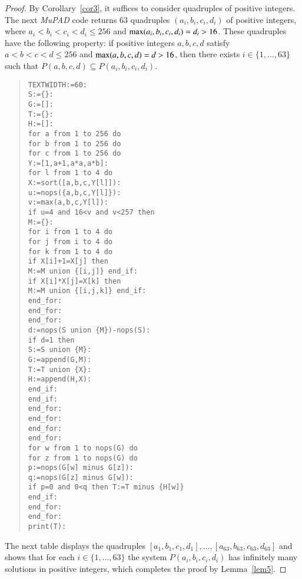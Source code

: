\documentclass[conference]{IEEEtran}
\begin{document}
\begin{proof}
By Corollary~\ref{cor3}, it suffices to consider quadruples of positive integers.
The next {\sl MuPAD} code returns $63$ quadruples \mbox{$(a_i,b_i,c_i,d_i)$} of positive integers,
where \mbox{$a_i<b_i<c_i<d_i \leqslant 256$} and \mbox{${\rm max}(a_i,b_i,c_i,d_i)=d_i>16$}. These quadruples
have the following property: if positive integers \mbox{$a,b,c,d$} satisfy \mbox{$a<b<c<d \leqslant 256$}
and \mbox{${\rm max}(a,b,c,d)=d>16$}, then there exists \mbox{$i \in \{1,\ldots,63\}$}
such that \mbox{$P(a,b,c,d) \subseteq P(a_i,b_i,c_i,d_i)$}.
\newpage
\begin{quote}
\begin{verbatim}
TEXTWIDTH:=60:
S:={}:
G:=[]:
T:={}:
H:=[]:
for a from 1 to 256 do
for b from 1 to 256 do
for c from 1 to 256 do
Y:=[1,a+1,a*a,a*b]:
for l from 1 to 4 do
X:=sort([a,b,c,Y[l]]):
u:=nops({a,b,c,Y[l]}):
v:=max(a,b,c,Y[l]):
if u=4 and 16<v and v<257 then
M:={}:
for i from 1 to 4 do
for j from i to 4 do
for k from 1 to 4 do
if X[i]+1=X[j] then
M:=M union {[i,j]} end_if:
if X[i]*X[j]=X[k] then
M:=M union {[i,j,k]} end_if:
end_for:
end_for:
end_for:
d:=nops(S union {M})-nops(S):
if d=1 then
S:=S union {M}:
G:=append(G,M):
T:=T union {X}:
H:=append(H,X):
end_if:
end_if:
end_for:
end_for:
end_for:
end_for:
for w from 1 to nops(G) do
for z from 1 to nops(G) do
p:=nops(G[w] minus G[z]):
q:=nops(G[z] minus G[w]):
if p=0 and 0<q then T:=T minus {H[w]}
end_if:
end_for:
end_for:
print(T):
\end{verbatim}
\end{quote}
\noindent
The next table displays the quadruples $[a_1,b_1,c_1,d_1],\ldots,[a_{63},b_{63},c_{63},d_{63}]$
and shows that for each \mbox{$i \in \{1,\ldots,63\}$} the system
\mbox{$P(a_i,b_i,c_i,d_i)$} has infinitely many solutions in positive
integers, which completes the proof by Lemma~\ref{lem5}.
\newpage
\begin{table}[ht!]


\end{table}
\end{proof}
\end{document}
